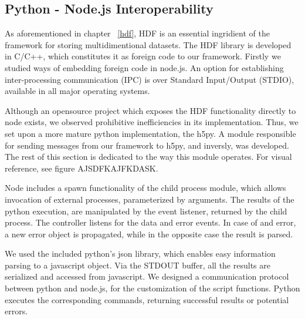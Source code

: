 \subsection{Python - Node.js Interoperability}
As aforementioned in chapter ~\ref{hdf}, HDF is an essential ingridient of the framework for storing multidimentional datasets. The HDF library is developed in C/C++, which constitutes it as foreign code to our framework. Firstly we studied ways of embedding foreign code in node.js. An option for establishing inter-processing communication (IPC) is over Standard Input/Output (STDIO), available in all major operating systems.\par 
	Although an opensource project which exposes the HDF functionality directly to node exists, we observed prohibitive inefficiencies in its implementation. Thus, we set upon a more mature python implementation, the h5py. A module responsible for sending messages from our framework to h5py, and inversly, was developed. The rest of this section is dedicated to the way this module operates. For visual reference, see figure AJSDFKAJFKDASK.\par 
Node includes a spawn functionality of the child process module, which allows invocation of external processes, parameterized by arguments. The results of the python execution, are manipulated by the event listener, returned by the child process. The controller listens for the data and error events. In case of and error, a new error object is propagated, while in the opposite case the result is parsed. \par 
We used the included python's json library, which enables easy  information parsing to a javascript object. Via the STDOUT buffer, all the results are serialized and accessed from javascript. We designed a communication protocol between python and node.js, for the customization of the script functions. Python executes the corresponding commands, returning successful results or potential errors.


